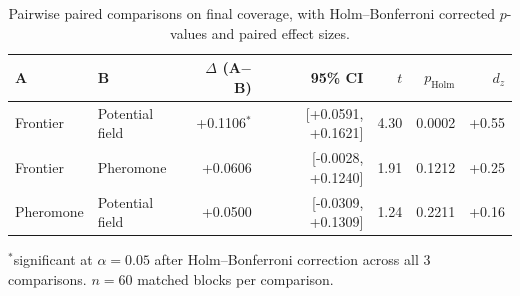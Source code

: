 \begin{table}[t]
\centering
\caption{Pairwise paired comparisons on final coverage, with Holm--Bonferroni corrected $p$-values and paired effect sizes.}
\label{tab:paired-coverage}
\small
\begin{tabular}{llrrrrr}
\toprule
A & B & $\Delta$ (A$-$B) & 95\% CI & $t$ & $p_{\mathrm{Holm}}$ & $d_z$ \\
\midrule
Frontier & Potential field & +0.1106$^{*}$ & [+0.0591, +0.1621] & 4.30 & 0.0002 & +0.55 \\
Frontier & Pheromone & +0.0606 & [-0.0028, +0.1240] & 1.91 & 0.1212 & +0.25 \\
Pheromone & Potential field & +0.0500 & [-0.0309, +0.1309] & 1.24 & 0.2211 & +0.16 \\
\bottomrule
\end{tabular}
\par\vspace{2pt}\footnotesize $^{*}$significant at $\alpha=0.05$ after Holm--Bonferroni correction across all 3 comparisons. $n=60$ matched blocks per comparison.
\end{table}
